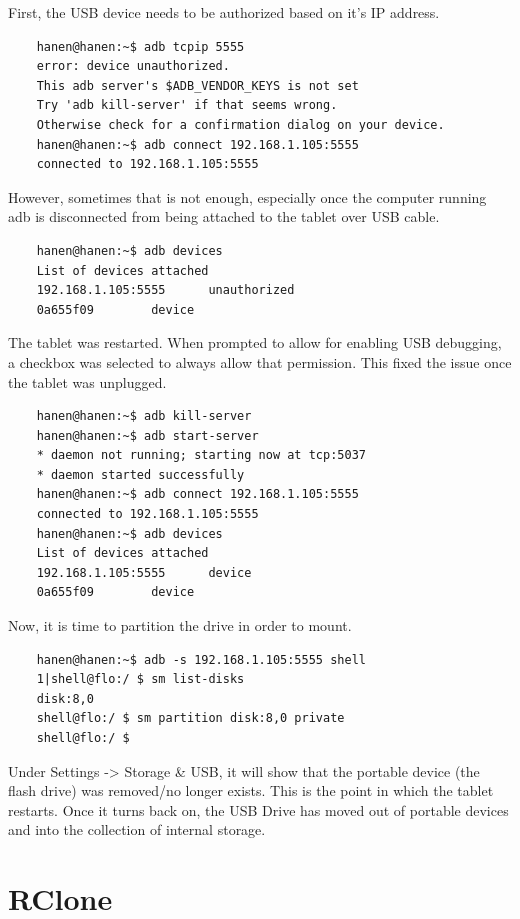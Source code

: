 First, the USB device needs to be authorized based on it's IP address.
\begin{verbatim}
    hanen@hanen:~$ adb tcpip 5555
    error: device unauthorized.
    This adb server's $ADB_VENDOR_KEYS is not set
    Try 'adb kill-server' if that seems wrong.
    Otherwise check for a confirmation dialog on your device.
    hanen@hanen:~$ adb connect 192.168.1.105:5555
    connected to 192.168.1.105:5555
\end{verbatim}
However, sometimes that is not enough, especially once the computer running adb is disconnected from being attached to the tablet over USB cable.
\begin{verbatim}
    hanen@hanen:~$ adb devices
    List of devices attached
    192.168.1.105:5555      unauthorized
    0a655f09        device
\end{verbatim}
The tablet was restarted. When prompted to allow for enabling USB debugging, a checkbox was selected to always allow that permission. This fixed the
issue once the tablet was unplugged.
\begin{verbatim}
    hanen@hanen:~$ adb kill-server
    hanen@hanen:~$ adb start-server
    * daemon not running; starting now at tcp:5037
    * daemon started successfully
    hanen@hanen:~$ adb connect 192.168.1.105:5555
    connected to 192.168.1.105:5555
    hanen@hanen:~$ adb devices
    List of devices attached
    192.168.1.105:5555      device
    0a655f09        device
\end{verbatim}
Now, it is time to partition the drive in order to mount.
\begin{verbatim}
    hanen@hanen:~$ adb -s 192.168.1.105:5555 shell
    1|shell@flo:/ $ sm list-disks                                                  
    disk:8,0
    shell@flo:/ $ sm partition disk:8,0 private
    shell@flo:/ $
\end{verbatim}
Under Settings -> Storage \& USB, it will show that the portable device (the flash drive) was removed/no longer exists. This is the point in which the tablet restarts. Once it turns back on, the USB Drive has moved out of portable devices and into the collection of internal storage.
\section{RClone}
